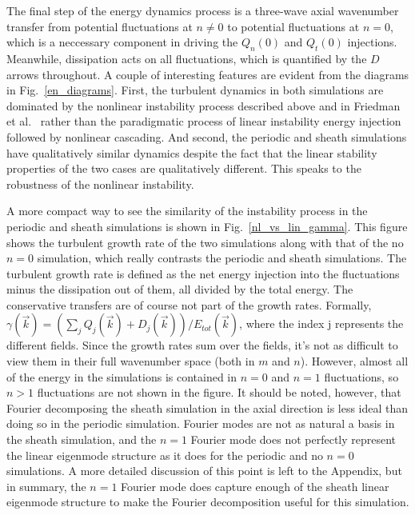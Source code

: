 \documentclass[showpacs,preprintnumbers,amsmath,amssymb,superscriptaddress,aip]{revtex4-1}
\begin{document}
The final step of the energy dynamics process is a three-wave axial wavenumber transfer from potential fluctuations at $n \ne 0$ to potential fluctuations at $n=0$, which is a neccessary component
in driving the $Q_n(0)$ and $Q_t(0)$ injections. Meanwhile, dissipation acts on all fluctuations, which is quantified by the $D$ arrows throughout. A couple of interesting features are evident
from the diagrams in Fig.~\ref{en_diagrams}. First, the turbulent dynamics in both simulations are dominated by the nonlinear instability process described above and in Friedman et al.~\cite{friedman2012}
rather than the paradigmatic process of linear instability energy injection followed by nonlinear cascading. And second,
the periodic and sheath simulations have qualitatively similar dynamics despite the fact that the linear stability properties of the two cases
are qualitatively different. This speaks to the robustness of the nonlinear instability.

A more compact way to see the similarity of the instability process in the periodic and sheath simulations is shown in Fig.~\ref{nl_vs_lin_gamma}. 
This figure shows the turbulent growth rate of the two simulations along with that of the no $n=0$ simulation, which really contrasts the periodic and sheath simulations. 
The turbulent growth rate is defined as the net energy injection
into the fluctuations minus the dissipation out of them, all divided by the total energy. The conservative transfers are of course not part of the growth rates.
Formally, $\gamma(\vec{k}) = (\sum_j Q_j(\vec{k}) + D_j(\vec{k}))/E_{tot}(\vec{k})$, where the index j represents the different fields.
Since the growth rates sum over the fields, it's not as difficult to view them in their full wavenumber space (both in $m$ and $n$). However, almost all of the energy in the simulations is 
contained in $n=0$ and $n=1$ fluctuations, so $n>1$ fluctuations are not shown in the figure. It should be noted, however, that Fourier decomposing the sheath simulation in the axial direction
is less ideal than doing so in the periodic simulation. Fourier modes are not as natural a basis in the sheath simulation, and the $n=1$ Fourier mode does not perfectly represent the linear
eigenmode structure as it does for the periodic and no $n=0$ simulations. 
A more detailed discussion of this point is left to the Appendix, but in summary, the $n=1$ Fourier mode does capture enough of the sheath
linear eigenmode structure to make the Fourier decomposition useful for this simulation.
\end{document}
